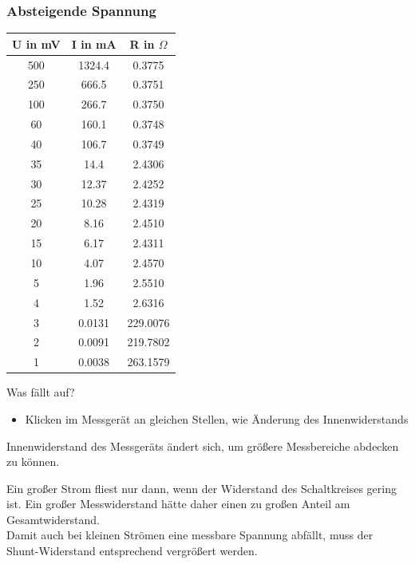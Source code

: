 \documentclass[compress,11pt]{beamer}
\begin{document}
\begin{frame}
\subsubsection{Absteigende Spannung}
\centering
\footnotesize
\begin{tabular}{|c|c|c|}
\hline 
U in mV & I in mA & R in $\Omega$ \\
\hline
500  &   1324.4& 0.3775 \\
250  &   666.5  & 0.3751 \\
100  &   266.7 & 0.3750 \\
60   &   160.1 & 0.3748 \\
40   &   106.7 & 0.3749 \\
35   &   14.4 &  2.4306 \\
30   &   12.37 & 2.4252 \\
25   &   10.28 & 2.4319 \\
20   &   8.16 &  2.4510 \\
15   &   6.17 &  2.4311 \\
10   &   4.07 &  2.4570 \\
5    &   1.96 &  2.5510 \\
4    &   1.52 &  2.6316 \\
3    &   0.0131 &  229.0076 \\
2    &   0.0091 & 219.7802 \\
1    &   0.0038 & 263.1579 \\
\hline
\end{tabular}
\end{frame}



\begin{frame}
\begin{block}{Was fällt auf?}
\begin{itemize}
\item Klicken im Messgerät an gleichen Stellen, wie Änderung des Innenwiderstands
 
\end{itemize}
Innenwiderstand des Messgeräts ändert sich, um größere Messbereiche abdecken zu können.
\end{block}
\end{frame}


\begin{frame}
Ein großer Strom fliest nur dann, wenn der Widerstand des Schaltkreises gering ist. Ein großer Messwiderstand hätte daher einen zu großen Anteil am Gesamtwiderstand.\\
Damit auch bei kleinen Strömen eine messbare Spannung abfällt, muss der Shunt-Widerstand entsprechend vergrößert werden.
\end{frame}
\end{document}
